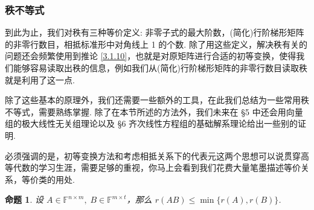 \documentclass[10pt,openany]{article}
\theoremstyle{thmstyle} %
\theoremstyle{defstyle} %
\theoremstyle{prostyle} %
\newtheorem{proposition}[theorem]{命题}
\theoremstyle{exastyle}
\theoremstyle{remstyle}
\newcommand{\F}{\mathbb{F}}
\newcommand{\nm}{^{n \times m}}
\begin{document}
\subsubsection{秩不等式}

到此为止，我们对秩有三种等价定义: 非零子式的最大阶数，(简化)行阶梯形矩阵的非零行数目，相抵标准形中对角线上 1 的个数. 除了用这些定义，解决秩有关的问题还会频繁使用到推论 \ref{3.1.10}，也就是对原矩阵进行合适的初等变换，使得我们能够容易读取出秩的信息，例如我们从(简化)行阶梯形矩阵的非零行数目读取秩就是利用了这一点.

除了这些基本的原理外，我们还需要一些额外的工具，在此我们总结为一些常用秩不等式，需要熟练掌握. 除了在本节所述的方法外，我们未来在 \S 5 中还会用向量组的极大线性无关组理论以及 \S 6 齐次线性方程组的基础解系理论给出一些别的证明.

必须强调的是，初等变换方法和考虑相抵关系下的代表元这两个思想可以说贯穿高等代数的学习生涯，需要足够的重视，你马上会看到我们花费大量笔墨描述等价关系，等价类的用处.

\begin{proposition} \label{3.1.13}
	设 \( A \in \F\nm, \; B \in \F^{m \times t} \)，那么 \( r(AB) \leq \min\{r(A),r(B)\} \).
\end{proposition}
\end{document}

